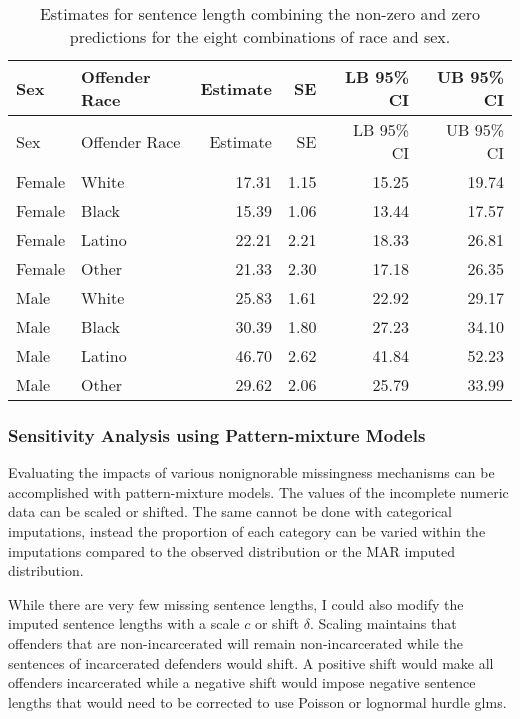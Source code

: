 \documentclass[
  letterpaper,
  DIV=11,
  numbers=noendperiod]{scrartcl}
\begin{document}
\hypertarget{tbl-race-sex-effects}{}
\begin{longtable}[]{@{}llrrrr@{}}
\caption{\label{tbl-race-sex-effects}Estimates for sentence length
combining the non-zero and zero predictions for the eight combinations
of race and sex.}\tabularnewline
\toprule\noalign{}
Sex & Offender Race & Estimate & SE & LB 95\% CI & UB 95\% CI \\
\midrule\noalign{}
\endfirsthead
\toprule\noalign{}
Sex & Offender Race & Estimate & SE & LB 95\% CI & UB 95\% CI \\
\midrule\noalign{}
\endhead
\bottomrule\noalign{}
\endlastfoot
Female & White & 17.31 & 1.15 & 15.25 & 19.74 \\
Female & Black & 15.39 & 1.06 & 13.44 & 17.57 \\
Female & Latino & 22.21 & 2.21 & 18.33 & 26.81 \\
Female & Other & 21.33 & 2.30 & 17.18 & 26.35 \\
Male & White & 25.83 & 1.61 & 22.92 & 29.17 \\
Male & Black & 30.39 & 1.80 & 27.23 & 34.10 \\
Male & Latino & 46.70 & 2.62 & 41.84 & 52.23 \\
Male & Other & 29.62 & 2.06 & 25.79 & 33.99 \\
\end{longtable}

\hypertarget{sensitivity-analysis-using-pattern-mixture-models}{%
\subsubsection{Sensitivity Analysis using Pattern-mixture
Models}\label{sensitivity-analysis-using-pattern-mixture-models}}

Evaluating the impacts of various nonignorable missingness mechanisms
can be accomplished with pattern-mixture models. The values of the
incomplete numeric data can be scaled or shifted. The same cannot be
done with categorical imputations, instead the proportion of each
category can be varied within the imputations compared to the observed
distribution or the MAR imputed distribution.

While there are very few missing sentence lengths, I could also modify
the imputed sentence lengths with a scale \(c\) or shift \(\delta\).
Scaling maintains that offenders that are non-incarcerated will remain
non-incarcerated while the sentences of incarcerated defenders would
shift. A positive shift would make all offenders incarcerated while a
negative shift would impose negative sentence lengths that would need to
be corrected to use Poisson or lognormal hurdle glms.
\end{document}
